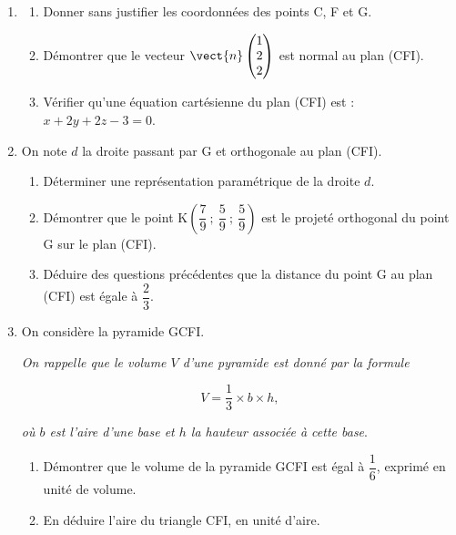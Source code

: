 \begin{enumerate}
\item 
	\begin{enumerate}
		\item Donner sans justifier les coordonnées des points C, F et G.
		\item Démontrer que le vecteur $\vect{n}\begin{pmatrix}1\\2\\2\end{pmatrix}$ est normal au plan (CFI).
		\item Vérifier qu'une équation cartésienne du plan (CFI) est : $x + 2y + 2z - 3 = 0$.
	\end{enumerate}	
\item  On note $d$ la droite passant par G et orthogonale au plan (CFI).
	\begin{enumerate}
		\item Déterminer une représentation paramétrique de la droite $d$.
		\item Démontrer que le point K$\left(\dfrac79~;~\dfrac59~;~\dfrac59\right)$ est le projeté orthogonal du point G sur le plan (CFI).
		\item Déduire des questions précédentes que la distance du point G au plan (CFI) est
égale à $\dfrac23$.
	\end{enumerate}
\item On considère la pyramide GCFI.

\emph{On rappelle que le volume $V$ d'une pyramide est donné par la formule} 

\[V = \frac13 \times b \times h,\]

\emph{où $b$ est l'aire d'une base et $h$ la hauteur associée à cette base}.
	\begin{enumerate}
		\item Démontrer que le volume de la pyramide GCFI est égal à $\dfrac16$, exprimé en unité de volume.
		\item En déduire l'aire du triangle CFI, en unité d'aire.
	\end{enumerate}
\end{enumerate}







